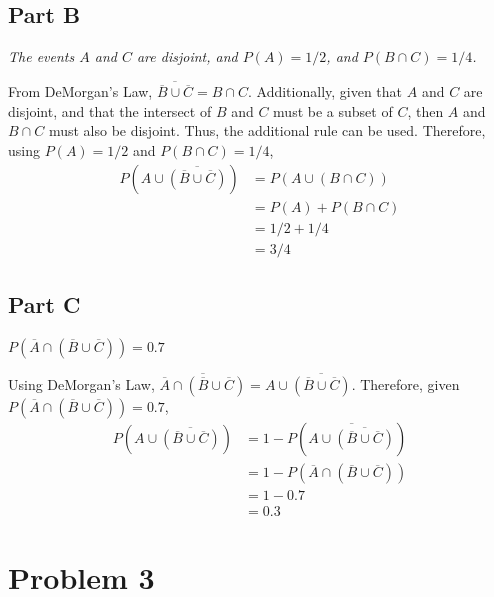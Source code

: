 \documentclass{article}
\begin{document}
\subsection*{Part B}

\textit{The events $ A $ and $ C $ are disjoint, and $ P(A) = 1/2 $, and $ P(B
\cap C) = 1/4 $.}

\bigbreak

From DeMorgan's Law, $ \overline{ \overline{B} \cup \overline{C} } = B \cap C $.
Additionally, given that $ A $ and $ C $ are disjoint, and that the intersect of
$ B $ and $ C $ must be a subset of $ C $, then $ A $ and $ B \cap C $ must also
be disjoint. Thus, the additional rule can be used. Therefore, using $ P(A) =
1/2 $ and $ P(B \cap C) = 1/4 $,
\begin{align*}
    P \left( A \cup \overline{ \left( \overline{B} \cup \overline{C} \right) }
    \right) &= P \left( A \cup \left( B \cap C \right) \right) \\
    &= P(A) + P(B \cap C) \\
    &= 1/2 + 1/4 \\
    &= 3/4
\end{align*}

\subsection*{Part C}

\textit{$ P \left( \overline{A} \cap \left( \overline{B} \cup \overline{C}
\right) \right) = 0.7 $}

\bigbreak

Using DeMorgan's Law, $ \overline{\overline{A} \cap \left( \overline{B} \cup
\overline{C} \right)} = A \cup \overline{\left( \overline{B}
\cup \overline{C} \right)} $. Therefore, given $ P \left( \overline{A} \cap
\left( \overline{B} \cup \overline{C} \right) \right) = 0.7 $,
\begin{align*}
    P \left( A \cup \overline{\left( \overline{B} \cup \overline{C} \right) }
    \right) &= 1 - P \left( \overline{A \cup \overline{\left( \overline{B} \cup
    \overline{C} \right)} } \right) \\
    &= 1 - P \left( \overline{A} \cap \left( \overline{B} \cup \overline{C}
    \right) \right) \\
    &= 1 - 0.7 \\
    &= 0.3
\end{align*}

\section*{Problem 3}
\end{document}
